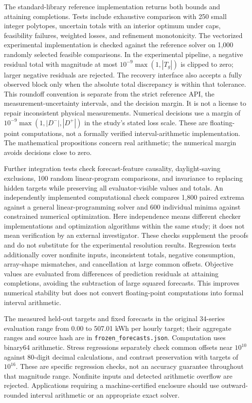 The standard-library reference implementation returns both bounds and
attaining completions. Tests include exhaustive comparison with 250
small integer polytopes, uncertain totals with an interior optimum under
caps, feasibility failures, weighted losses, and refinement monotonicity.
The vectorized experimental implementation is checked against the reference
solver on 1,000 randomly selected feasible comparisons. In the experimental
pipeline, a negative residual total with magnitude at most
$10^{-9}\max(1,|T_g|)$ is clipped to zero; larger negative residuals are
rejected. The recovery interface also accepts a fully observed block only
when the absolute total discrepancy is within that tolerance. This
roundoff convention is separate from the strict reference API, the
measurement-uncertainty intervals, and the decision margin. It is not a
license to repair inconsistent physical measurements. Numerical decisions
use a margin of $10^{-9}\max(1,|D^-|,|D^+|)$ in the study's stated loss
scale. These are floating-point computations, not a formally verified
interval-arithmetic implementation. The mathematical propositions concern
real arithmetic; the numerical margin avoids decisions close to zero.

Further integration tests check forecast-feature causality,
daylight-saving exclusions, 100 random linear-program comparisons, and
invariance to replacing hidden targets while preserving all evaluator-visible
values and totals. An independently implemented computational check compares 1,800 paired
extrema against a general linear-programming solver and 600 individual
minima against constrained numerical optimization. Here independence means
different checker implementations and optimization algorithms within the
same study; it does not mean verification by an external investigator.
These checks supplement
the proofs and do not substitute for the experimental resolution results.
Regression tests additionally cover nonfinite inputs, inconsistent totals,
negative consumption, array-shape mismatches, and cancellation at large
common offsets. Objective values are evaluated from differences of prediction
residuals at attaining completions, avoiding the subtraction of large
squared forecasts. This improves numerical stability but does not convert
floating-point computations into formal interval arithmetic.

The measured held-out targets and fixed forecasts in the original
34-series evaluation range from 0.00 to 507.01 kWh per hourly target;
their aggregate ranges and source hash are in \texttt{frozen\_forecasts.json}.
Computation uses binary64 arithmetic. Stress regressions separately check
common offsets near $10^{10}$ against 80-digit decimal calculations, and
contrast preservation with targets of $10^{16}$. These are specific
regression checks, not an accuracy guarantee throughout that magnitude
range. Nonfinite inputs and detected arithmetic overflow are rejected.
Applications requiring a machine-certified enclosure should use
outward-rounded interval arithmetic or an appropriate exact solver.


